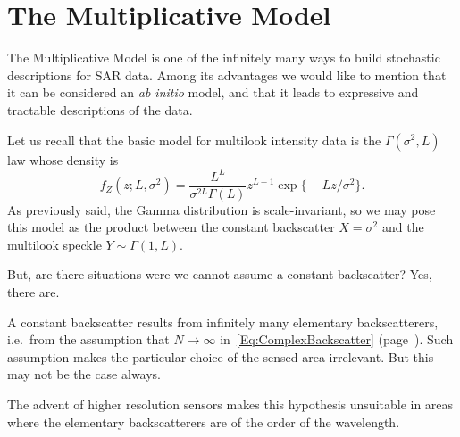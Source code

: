 \chapter{The Multiplicative Model}\label{Chapter:MultiplicativeModel}

The Multiplicative Model is one of the infinitely many ways to build stochastic descriptions for SAR data.
Among its advantages we would like to mention that it can be considered an \textit{ab initio} model, and that it leads to expressive and tractable descriptions of the data.

Let us recall that the basic model for multilook intensity data is the $\Gamma(\sigma^2,L)$ law whose density is
\begin{equation}
f_Z(z;L,\sigma^2) = \frac{L^L}{\sigma^{2L}\Gamma(L)} z^{L-1} 
	\exp\big\{ -L z / \sigma^2
	\big\}.
\end{equation}
As previously said, the Gamma distribution is scale-invariant, so we may pose this model as the product between the constant backscatter $X=\sigma^2$ and the multilook speckle $Y\sim\Gamma(1,L)$.

But, are there situations were we cannot assume a constant backscatter?
Yes, there are.

A constant backscatter results from infinitely many elementary backscatterers, i.e.\ from the assumption that $N\to\infty$ in~\eqref{Eq:ComplexBackscatter} (page~\pageref{Eq:ComplexBackscatter}).
Such assumption makes the particular choice of the sensed area irrelevant.
But this may not be the case always.

The advent of higher resolution sensors makes this hypothesis unsuitable in areas where the elementary backscatterers are of the order of the wavelength.
